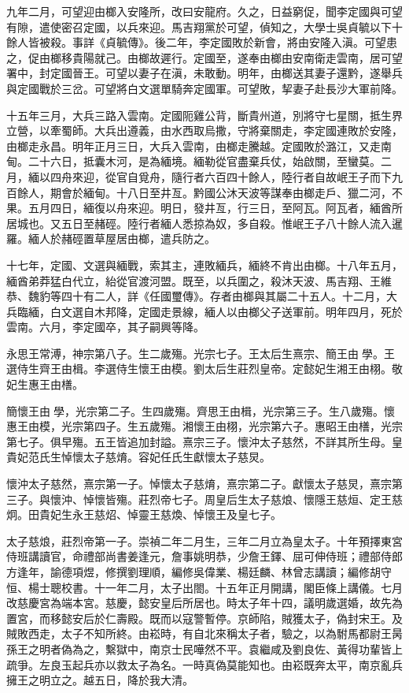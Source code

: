 九年二月，可望迎由榔入安隆所，改曰安龍府。久之，日益窮促，聞李定國與可望有隙，遣使密召定國，以兵來迎。馬吉翔黨於可望，偵知之，大學士吳貞毓以下十餘人皆被殺。事詳《貞毓傳》。後二年，李定國敗於新會，將由安隆入滇。可望患之，促由榔移貴陽就己。由榔故遲行。定國至，遂奉由榔由安南衛走雲南，居可望署中，封定國晉王。可望以妻子在滇，未敢動。明年，由榔送其妻子還黔，遂舉兵與定國戰於三岔。可望將白文選單騎奔定國軍。可望敗，挈妻子赴長沙大軍前降。

十五年三月，大兵三路入雲南。定國阨雞公背，斷貴州道，別將守七星關，抵生界立營，以牽蜀師。大兵出遵義，由水西取烏撒，守將棄關走，李定國連敗於安隆，由榔走永昌。明年正月三日，大兵入雲南，由榔走騰越。定國敗於潞江，又走南甸。二十六日，抵囊木河，是為緬境。緬勒從官盡棄兵仗，始啟關，至蠻莫。二月，緬以四舟來迎，從官自覓舟，隨行者六百四十餘人，陸行者自故岷王子而下九百餘人，期會於緬甸。十八日至井亙。黔國公沐天波等謀奉由榔走戶、獵二河，不果。五月四日，緬復以舟來迎。明日，發井亙，行三日，至阿瓦。阿瓦者，緬酋所居城也。又五日至赭硜。陸行者緬人悉掠為奴，多自殺。惟岷王子八十餘人流入暹羅。緬人於赭硜置草屋居由榔，遣兵防之。

十七年，定國、文選與緬戰，索其主，連敗緬兵，緬終不肯出由榔。十八年五月，緬酋弟莽猛白代立，紿從官渡河盟。既至，以兵圍之，殺沐天波、馬吉翔、王維恭、魏豹等四十有二人，詳《任國璽傳》。存者由榔與其屬二十五人。十二月，大兵臨緬，白文選自木邦降，定國走景線，緬人以由榔父子送軍前。明年四月，死於雲南。六月，李定國卒，其子嗣興等降。

永思王常溥，神宗第八子。生二歲殤。光宗七子。王太后生熹宗、簡王由學。王選侍生齊王由楫。李選侍生懷王由模。劉太后生莊烈皇帝。定懿妃生湘王由栩。敬妃生惠王由橏。

簡懷王由學，光宗第二子。生四歲殤。齊思王由楫，光宗第三子。生八歲殤。懷惠王由模，光宗第四子。生五歲殤。湘懷王由栩，光宗第六子。惠昭王由橏，光宗第七子。俱早殤。五王皆追加封謚。熹宗三子。懷沖太子慈然，不詳其所生母。皇貴妃范氏生悼懷太子慈焴。容妃任氏生獻懷太子慈炅。

懷沖太子慈然，熹宗第一子。悼懷太子慈焴，熹宗第二子。獻懷太子慈炅，熹宗第三子。與懷沖、悼懷皆殤。莊烈帝七子。周皇后生太子慈烺、懷隱王慈烜、定王慈炯。田貴妃生永王慈炤、悼靈王慈煥、悼懷王及皇七子。

太子慈烺，莊烈帝第一子。崇禎二年二月生，三年二月立為皇太子。十年預擇東宮侍班講讀官，命禮部尚書姜逢元，詹事姚明恭，少詹王鐸、屈可伸侍班；禮部侍郎方逢年，諭德項煜，修撰劉理順，編修吳偉業、楊廷麟、林曾志講讀；編修胡守恒、楊士聰校書。十一年二月，太子出閤。十五年正月開講，閣臣條上講儀。七月改慈慶宮為端本宮。慈慶，懿安皇后所居也。時太子年十四，議明歲選婚，故先為置宮，而移懿安后於仁壽殿。既而以寇警暫停。京師陷，賊獲太子，偽封宋王。及賊敗西走，太子不知所終。由崧時，有自北來稱太子者，驗之，以為駙馬都尉王昺孫王之明者偽為之，繫獄中，南京士民嘩然不平。袁繼咸及劉良佐、黃得功輩皆上疏爭。左良玉起兵亦以救太子為名。一時真偽莫能知也。由崧既奔太平，南京亂兵擁王之明立之。越五日，降於我大清。

